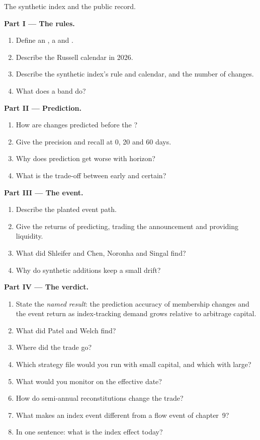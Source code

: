\begin{problem}\label{pb:s1:index-rebalancing:1}
The synthetic index and the public record.

\medskip\noindent\textbf{Part I --- The rules.}
\begin{enumerate}
\item Define an , a  and .
\item Describe the Russell calendar in 2026.
\item Describe the synthetic index's rule and calendar, and the number of changes.
\item What does a band do?
\end{enumerate}

\medskip\noindent\textbf{Part II --- Prediction.}
\begin{enumerate}[resume]
\item How are changes predicted before the ?
\item Give the precision and recall at 0, 20 and 60 days.
\item Why does prediction get worse with horizon?
\item What is the trade-off between early and certain?
\end{enumerate}

\medskip\noindent\textbf{Part III --- The event.}
\begin{enumerate}[resume]
\item Describe the planted event path.
\item Give the returns of predicting, trading the announcement and providing liquidity.
\item What did Shleifer and Chen, Noronha and Singal find?
\item Why do synthetic additions keep a small drift?
\end{enumerate}

\medskip\noindent\textbf{Part IV --- The verdict.}
\begin{enumerate}[resume]
\item State the \emph{named result}: the prediction accuracy of membership changes and the event return as index-tracking demand grows relative to
arbitrage capital.
\item What did Patel and Welch find?
\item Where did the trade go?
\item Which strategy file would you run with small capital, and which with large?
\item What would you monitor on the effective date?
\item How do semi-annual reconstitutions change the trade?
\item What makes an index event different from a flow event of chapter~9?
\item In one sentence: what is the index effect today?
\end{enumerate}
\end{problem}

